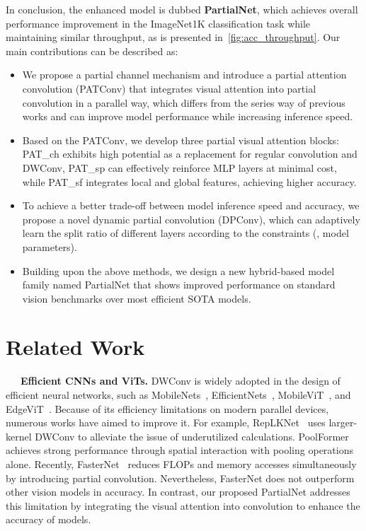 In conclusion, the enhanced model is dubbed {\bf PartialNet}, which achieves overall performance improvement in the ImageNet1K classification task while maintaining similar throughput, as is presented in~\cref{fig:acc_throughput}. Our main contributions can be described as:
\begin{itemize}
  \item We propose a partial channel mechanism and introduce a partial attention convolution (PATConv) that integrates visual attention into partial convolution in a parallel way, which differs from the series way of previous works and can improve model performance while increasing inference speed.
  \item Based on the PATConv, we develop three partial visual attention blocks: PAT\_ch exhibits high potential as a replacement for regular convolution and DWConv, PAT\_sp can effectively reinforce MLP layers at minimal cost, while PAT\_sf integrates local and global features, achieving higher accuracy.
  \item To achieve a better trade-off between model inference speed and accuracy, we propose a novel dynamic partial convolution (DPConv), which can adaptively learn the split ratio of different layers according to the constraints (\eg, model parameters).
  \item Building upon the above methods, we design a new hybrid-based model family named PartialNet that shows improved performance on standard vision benchmarks over most efficient SOTA models.
\end{itemize}

\section{Related Work}
\label{sec:related_work}
~~~{\bf Efficient CNNs and ViTs.}
DWConv is widely adopted in the design of efficient neural networks, such as MobileNets~\cite{Sandler2018a, Howard2019}, EfficientNets~\cite{Tan2019, tan2021efficientnetv2}, MobileViT~\cite{Mehta2021}, and EdgeViT~\cite{Pan2022}. Because of its efficiency limitations on modern parallel devices, numerous works have aimed to improve it. For example, RepLKNet~\cite{ding2022scaling} uses larger-kernel DWConv to alleviate the issue of underutilized calculations. PoolFormer~\cite{Yu2022a} achieves strong performance through spatial interaction with pooling operations alone. Recently, FasterNet~\cite{Chen2023} reduces FLOPs and memory accesses simultaneously by introducing partial convolution. Nevertheless, FasterNet does not outperform other vision models in accuracy. In contrast, our proposed PartialNet addresses this limitation by integrating the visual attention into convolution to enhance the accuracy of models.

